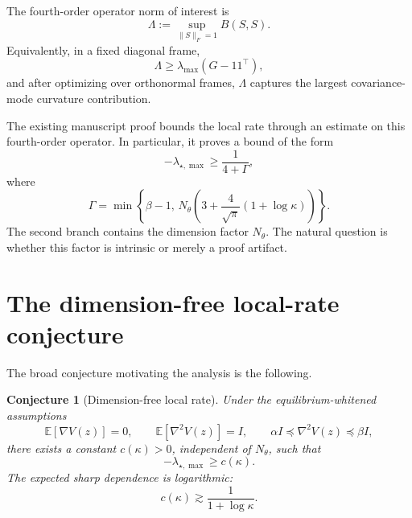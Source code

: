 \documentclass[11pt]{article}
\numberwithin{equation}{section}
\newtheorem{conjecture}[theorem]{Conjecture}
\begin{document}
The fourth-order operator norm of interest is
\begin{equation}
    \Lambda
    :=
    \sup_{\|S\|_F=1}
    B(S,S).
\end{equation}
Equivalently, in a fixed diagonal frame,
\begin{equation}
    \Lambda
    \ge
    \lambda_{\max}(G-11^\top),
\end{equation}
and after optimizing over orthonormal frames, $\Lambda$ captures the largest covariance-mode curvature contribution.

The existing manuscript proof bounds the local rate through an estimate on this fourth-order operator. 
In particular, it proves a bound of the form
\begin{equation}
    -\lambda_{\star,\max}
    \ge
    \frac{1}{4+\Gamma},
\end{equation}
where
\begin{equation}
    \Gamma
    =
    \min
    \left\{
    \beta-1,
    \,
    N_\theta
    \left(
    3+\frac{4}{\sqrt{\pi}}(1+\log\kappa)
    \right)
    \right\}.
\end{equation}
The second branch contains the dimension factor $N_\theta$. 
The natural question is whether this factor is intrinsic or merely a proof artifact.

\section{The dimension-free local-rate conjecture}

The broad conjecture motivating the analysis is the following.

\begin{conjecture}[Dimension-free local rate]
Under the equilibrium-whitened assumptions
\begin{equation}
    \mathbb E[\nabla V(z)]=0,
    \qquad
    \mathbb E[\nabla^2 V(z)]=I,
    \qquad
    \alpha I\preceq \nabla^2 V(z)\preceq \beta I,
\end{equation}
there exists a constant $c(\kappa)>0$, independent of $N_\theta$, such that
\begin{equation}
    -\lambda_{\star,\max}
    \ge
    c(\kappa).
\end{equation}
The expected sharp dependence is logarithmic:
\begin{equation}
    c(\kappa)
    \gtrsim
    \frac{1}{1+\log\kappa}.
\end{equation}
\end{conjecture}
\end{document}
